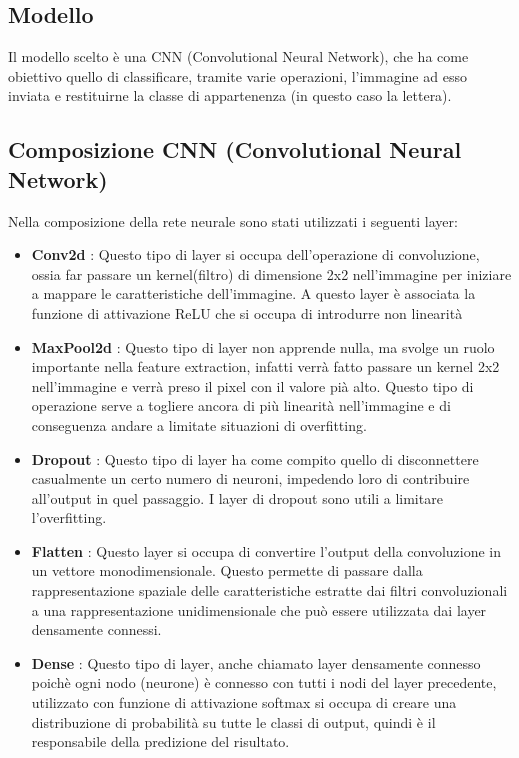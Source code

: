 \documentclass{article}
\begin{document}
\subsection{Modello}
Il modello scelto è una CNN (Convolutional Neural Network), che ha come obiettivo quello di classificare, tramite varie operazioni, l'immagine ad esso inviata e restituirne la classe di appartenenza (in questo caso la lettera).
\subsection{Composizione CNN (Convolutional Neural Network)}
Nella composizione della rete neurale sono stati utilizzati i seguenti layer:
\begin{itemize}
  \item \textbf{Conv2d} : Questo tipo di layer si occupa dell'operazione di convoluzione, ossia far passare un kernel(filtro) di dimensione 2x2 nell'immagine per iniziare a mappare le caratteristiche dell'immagine. A questo layer è associata la funzione di attivazione ReLU che si occupa di introdurre non linearità
  \item \textbf{MaxPool2d} : Questo tipo di layer non apprende nulla, ma svolge un ruolo importante nella feature extraction, infatti verrà fatto passare un kernel 2x2 nell'immagine e verrà preso il pixel con il valore pià alto. Questo tipo di operazione serve a togliere ancora di più linearità nell'immagine e di conseguenza andare a limitate situazioni di overfitting.
  \item \textbf{Dropout} : Questo tipo di layer ha come compito quello di disconnettere casualmente un certo numero di neuroni, impedendo loro di contribuire all'output in quel passaggio. I layer di dropout sono utili a limitare l'overfitting.
  \item \textbf{Flatten} : Questo layer si occupa di convertire l'output della convoluzione in un vettore monodimensionale. Questo permette di passare dalla rappresentazione spaziale delle caratteristiche estratte dai filtri convoluzionali a una rappresentazione unidimensionale che può essere utilizzata dai layer densamente connessi.
  \item \textbf{Dense} : Questo tipo di layer, anche chiamato layer densamente connesso poichè ogni nodo (neurone) è connesso con tutti i nodi del layer precedente, utilizzato con funzione di attivazione softmax si occupa di creare una distribuzione di probabilità su tutte le classi di output, quindi è il responsabile della predizione del risultato.
\end{itemize}
\end{document}
